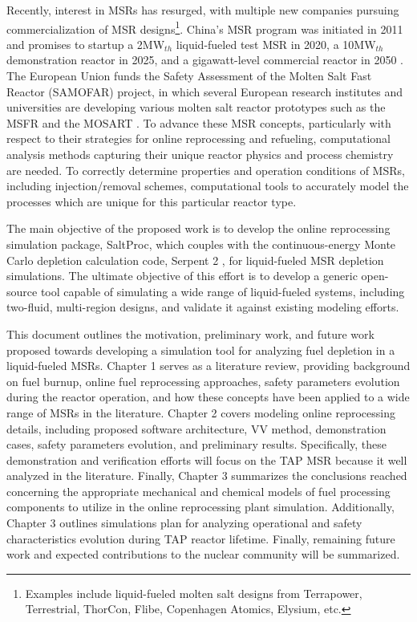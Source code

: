 Recently, interest in \glspl{MSR} has resurged, with multiple new companies 
pursuing commercialization of \gls{MSR} designs\footnote{Examples 
include liquid-fueled molten salt designs from Terrapower, Terrestrial, 
ThorCon, Flibe, Copenhagen Atomics, Elysium, etc.}. China's \gls{MSR} program 
was initiated in 2011 and promises to startup a 2MW$_{th}$ 
liquid-fueled test \gls{MSR} in 2020, a 10MW$_{th}$ 
demonstration reactor in 2025, and a gigawatt-level 
commercial reactor in 2050 \cite{zhang_review_2018}. The European 
Union funds the Safety Assessment of the Molten Salt Fast Reactor 
(SAMOFAR) project, in which several European research institutes and 
universities are developing various molten salt reactor prototypes 
such as the \gls{MSFR} \cite{fiorina_molten_2013} and the \gls{MOSART} 
\cite{ignatiev_molten_2014}.
To advance these \gls{MSR} concepts, particularly with respect 
to their strategies for online reprocessing and refueling, 
computational analysis methods capturing their unique reactor physics 
and process chemistry are needed. To correctly determine properties and 
operation conditions of \glspl{MSR}, including injection/removal schemes, 
computational tools to accurately model the processes which are unique for 
this particular reactor type. 

The main objective of the proposed work is to develop the online 
reprocessing simulation package, SaltProc, which couples with the 
continuous-energy Monte Carlo depletion calculation code, Serpent 2 
\cite{leppanen_serpent_2015}, for liquid-fueled \gls{MSR} depletion 
simulations. The ultimate objective of this effort is to develop a generic 
open-source tool capable of simulating a wide range of liquid-fueled 
systems, including two-fluid, multi-region designs, and validate it against 
existing modeling efforts. 

This document outlines the motivation, preliminary work, and future work 
proposed towards developing a simulation tool for analyzing fuel depletion in 
a liquid-fueled \glspl{MSR}. Chapter 1 serves as a literature review, 
providing background on fuel burnup, online fuel reprocessing approaches, 
safety parameters evolution during the reactor operation, and how these 
concepts have been applied to a wide range of \glspl{MSR} in the literature. 
Chapter 2 covers modeling online reprocessing details, including proposed 
software architecture, \gls{VV} method, demonstration cases, safety 
parameters evolution, and preliminary results. Specifically, these 
demonstration and verification efforts will 
focus on the \gls{TAP} \gls{MSR} because it well analyzed in the literature. 
Finally, Chapter 3 summarizes the conclusions reached concerning the 
appropriate mechanical and chemical models of fuel processing 
components to utilize in the online reprocessing plant simulation. 
Additionally, Chapter 3 outlines simulations plan for analyzing operational 
and safety characteristics evolution during \gls{TAP} reactor lifetime. 
Finally, remaining future work and expected contributions to the 
nuclear community will be summarized.

